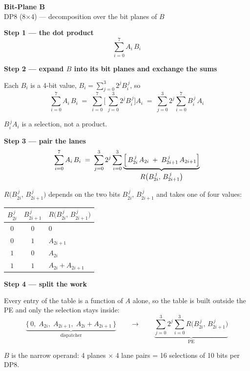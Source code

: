 \documentclass[fleqn]{article}
\newcommand{\Rf}{R\bigl(B_{2i}^{\,j},\, B_{2i+1}^{\,j}\bigr)}
\begin{document}
\begin{center}
{\LARGE \textbf{Bit-Plane B}}\\[4pt]
{\large DP8 (8$\times$4) --- decomposition over the bit planes of $B$}
\end{center}

\vspace{3em}

\noindent\textbf{Step 1 --- the dot product}
\[
\sum_{i=0}^{7} A_i \, B_i
\]

\vspace{0.5em}

\noindent\textbf{Step 2 --- expand $B$ into its bit planes and exchange the sums}

\noindent Each $B_i$ is a 4-bit value, $B_i = \sum_{j=0}^{3} 2^{j} B_i^{\,j}$, so
\[
\sum_{i=0}^{7} A_i \, B_i
  \;=\; \sum_{i=0}^{7} \Biggl[\, \sum_{j=0}^{3} 2^{j} B_i^{\,j} \Biggr] A_i
  \;=\; \sum_{j=0}^{3} 2^{j} \sum_{i=0}^{7} B_i^{\,j} \, A_i
\]

\noindent $B_i^{\,j} A_i$ is a selection, not a product.

\vspace{0.5em}

\noindent\textbf{Step 3 --- pair the lanes}
\[
\sum_{i=0}^{7} A_i \, B_i
  \;=\; \sum_{j=0}^{3} 2^{j} \sum_{i=0}^{3}
        \underbrace{\Bigl[\, B_{2i}^{\,j} \, A_{2i} \;+\; B_{2i+1}^{\,j} \, A_{2i+1} \Bigr]}_{\textstyle \Rf}
\]

\noindent $\Rf$ depends on the two bits $B_{2i}^{\,j}$, $B_{2i+1}^{\,j}$ and takes one of
four values:

\vspace{1em}

\begin{center}
\renewcommand{\arraystretch}{1.35}
\begin{tabular}{c c | l}
$B_{2i}^{\,j}$ & $B_{2i+1}^{\,j}$ & \multicolumn{1}{c}{$\Rf$} \\
\hline
$0$ & $0$ & $0$ \\
$0$ & $1$ & $A_{2i+1}$ \\
$1$ & $0$ & $A_{2i}$ \\
$1$ & $1$ & $A_{2i} + A_{2i+1}$ \\
\end{tabular}
\end{center}

\vspace{1.5em}

\noindent\textbf{Step 4 --- split the work}

\noindent Every entry of the table is a function of $A$ alone, so the table is built
outside the PE and only the selection stays inside:
\[
\underbrace{\bigl\{\, 0,\; A_{2i},\; A_{2i+1},\; A_{2i} + A_{2i+1} \,\bigr\}}_{\textstyle \text{dispatcher}}
\qquad\longrightarrow\qquad
\underbrace{\sum_{j=0}^{3} 2^{j} \sum_{i=0}^{3} \Rf}_{\textstyle \text{PE}}
\]

\vspace{1.5em}

\noindent $B$ is the narrow operand: 4 planes $\times$ 4 lane pairs = 16 selections of
10 bits per DP8.
\end{document}
